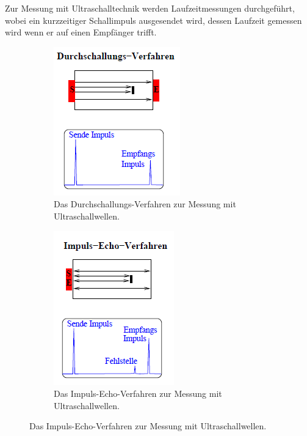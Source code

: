     Zur Messung mit Ultraschalltechnik werden Laufzeitmessungen durchgeführt,
    wobei ein kurzzeitiger Schallimpuls ausgesendet wird,
    dessen Laufzeit gemessen wird wenn er auf einen Empfänger trifft.\\
    \clearpage
    \begin{figure}
        \centering
        \begin{subfigure}{0.48\textwidth}
            \centering
            \includegraphics[scale=1]{durchschallung.PNG}
            \caption{Das Durchschallungs-Verfahren zur Messung mit Ultraschallwellen.}
            \label{fig:durchschallung}
        \end{subfigure}
        \begin{subfigure}{0.48\textwidth}
            \centering
            \includegraphics[scale=1]{impuls-echo.PNG}
            \caption{Das Impuls-Echo-Verfahren zur Messung mit Ultraschallwellen.}
            \label{fig:impuls_echo}
        \end{subfigure}
    \end{figure}

